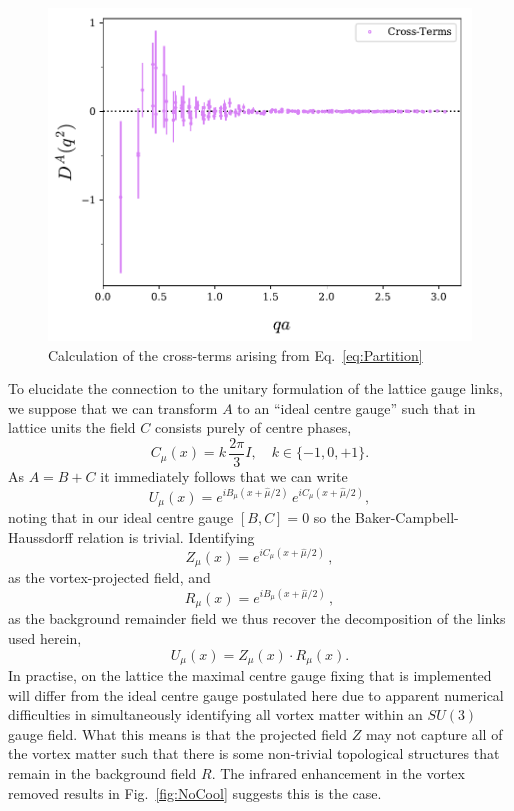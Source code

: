 \begin{figure}[htb!]
\centering
\includegraphics[width=0.9\linewidth]{./ScalarGluComp_q2_CrossTerms.pdf}
\caption{\label{fig:CrossTerms} Calculation of the cross-terms arising from Eq.~\ref{eq:Partition}}
\end{figure} 
%

To elucidate the connection to the unitary formulation of the lattice gauge links, we suppose that we can transform $A$ to an ``ideal centre gauge'' such that in lattice units the field $C$ consists purely of centre phases,
%
\begin{equation}
C_\mu(x) = k\,\frac{2\pi}{3} I,\quad k\in \{-1,0,+1\}.
\end{equation}
%
As $A = B + C$ it immediately follows that we can write
\begin{equation}
U_{\mu}(x) = e^{i B_{\mu}(x+\hat{\mu}/2)} \, e^{i C_{\mu}(x+\hat{\mu}/2)},
\end{equation}
noting that in our ideal centre gauge $[B,C] = 0$ so the Baker-Campbell-Haussdorff relation is trivial. Identifying
\begin{equation}
Z_{\mu}(x) = e^{i C_{\mu}(x+\hat{\mu}/2)}\, ,
\end{equation}
as the vortex-projected field, and
\begin{equation}
R_{\mu}(x) = e^{i B_{\mu}(x+\hat{\mu}/2)}\, ,
\end{equation}
as the background remainder field we thus recover the decomposition of the links used herein,
\begin{equation}
U_{\mu}(x) = Z_{\mu}(x)\cdot R_{\mu}(x).
\end{equation}
In practise, on the lattice the maximal centre gauge fixing that is implemented will differ from the ideal centre gauge postulated here due to apparent numerical difficulties in simultaneously identifying all vortex matter within an $SU(3)$ gauge field. What this means is that the projected field $Z$ may not capture all of the vortex matter such that there is some non-trivial topological structures that remain in the background field $R.$ The infrared enhancement in the vortex removed results in Fig.~\ref{fig:NoCool} suggests this is the case.\\


